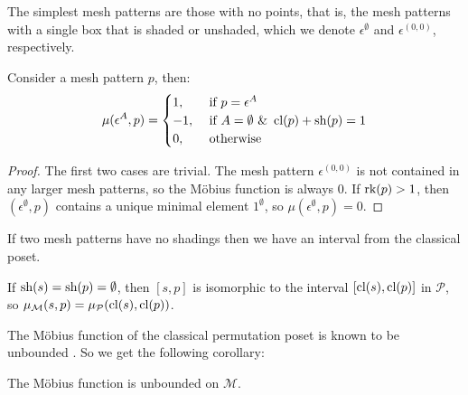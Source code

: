 \documentclass[11pt,a4paper,oneside]{article}
\begin{document}
The simplest mesh patterns are those with no points, that is, the mesh patterns
with a single box that is shaded or unshaded, which we denote
$\epsilon^\emptyset$ and $\epsilon^{(0,0)}$, respectively.
\begin{lem}
Consider a mesh pattern $p$, then:
$$\mu(\epsilon^{A},p)=\begin{cases}
1,&\mbox{ if }p=\epsilon^A \\
-1,&\mbox{ if }A=\emptyset\,\,\&\,\,\operatorname{\textrm{cl}}(p)+\operatorname{\textrm{sh}}(p)=1\\
0,&\mbox{ otherwise}
\end{cases}$$
\begin{proof}
The first two cases are trivial. The
mesh pattern $\epsilon^{(0,0)}$ is not contained in any larger mesh patterns, so
the M\"obius function is always $0$. If $\operatorname{\textrm{rk}}(p)>1$, then
$(\epsilon^\emptyset,p)$ contains a unique minimal element $1^\emptyset$, so
$\mu(\epsilon^\emptyset,p)=0$.
\end{proof}
\end{lem}

If two mesh patterns have no shadings then we have an interval from the
classical poset.

\begin{lem}
If $\operatorname{\textrm{sh}}(s)=\operatorname{\textrm{sh}}(p)=\emptyset$, then $[s,p]$ is isomorphic to the interval
$[\operatorname{\textrm{cl}}(s),\operatorname{\textrm{cl}}(p)]$ in $\mathcal{P}$, so $\operatorname{\mu_\mathcal{M}}(s,p)=\operatorname{\mu_\mathcal{P}}(\operatorname{\textrm{cl}}(s),\operatorname{\textrm{cl}}(p))$.
\end{lem}

The M\"obius function of the classical permutation poset is known to be
unbounded \cite{Smith13}. So we get the following corollary:

\begin{cor}
The M\"obius function is unbounded on $\mathcal{M}$.
\end{cor}
\end{document}
